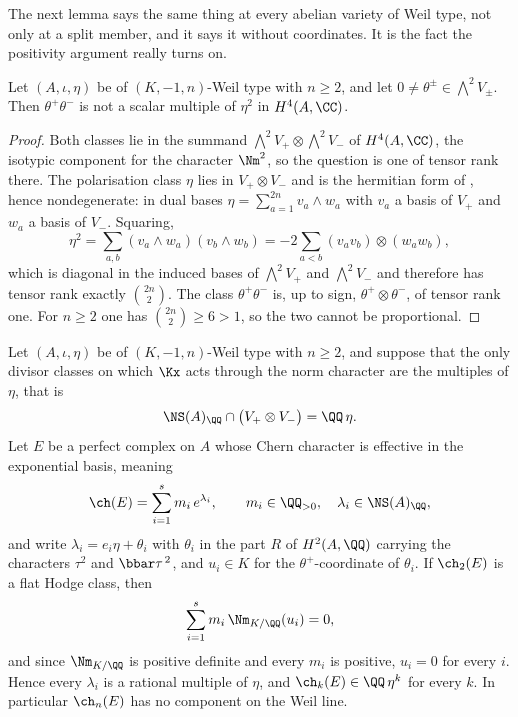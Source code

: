 The next lemma says the same thing at every abelian variety of Weil type, not
only at a split member, and it says it without coordinates. It is the fact the
positivity argument really turns on.

\begin{lemma}
\label{lem:tensorrank}
Let $(A,\iota,\eta)$ be of $(K,-1,n)$-Weil type with $n\ge2$, and let
$0\ne\theta^{\pm}\in\bigwedge^{2}V_{\pm}$. Then $\theta^{+}\theta^{-}$ is not a
scalar multiple of $\eta^{2}$ in $H^{4}(A,\CC)$.
\end{lemma}

\begin{proof}
Both classes lie in the summand
$\bigwedge^{2}V_{+}\otimes\bigwedge^{2}V_{-}$ of $H^{4}(A,\CC)$, the isotypic
component for the character $\Nm^{2}$, so the question is one of tensor rank
there. The polarisation class $\eta$ lies in $V_{+}\otimes V_{-}$ and is the
hermitian form of , hence nondegenerate: in dual bases
$\eta=\sum_{a=1}^{2n}v_{a}\wedge w_{a}$ with $v_{a}$ a basis of $V_{+}$ and
$w_{a}$ a basis of $V_{-}$. Squaring,
\[
  \eta^{2}
  =\sum_{a,b}(v_{a}\wedge w_{a})(v_{b}\wedge w_{b})
  =-2\sum_{a<b}(v_{a}v_{b})\otimes(w_{a}w_{b}),
\]
which is diagonal in the induced bases of $\bigwedge^{2}V_{+}$ and
$\bigwedge^{2}V_{-}$ and therefore has tensor rank exactly $\binom{2n}{2}$.
The class $\theta^{+}\theta^{-}$ is, up to sign,
$\theta^{+}\otimes\theta^{-}$, of tensor rank one. For $n\ge2$ one has
$\binom{2n}{2}\ge6>1$, so the two cannot be proportional.
\end{proof}

\begin{theorem}\label{thm:positivity}
Let $(A,\iota,\eta)$ be of $(K,-1,n)$-Weil type with $n\ge2$, and suppose that
the only divisor classes on which $\Kx$ acts through the norm character are
the multiples of $\eta$, that is
\begin{equation}\label{eq:noextranorm}
  \NS(A)_{\QQ}\cap\bigl(V_{+}\otimes V_{-}\bigr)=\QQ\,\eta .
\end{equation}
Let $E$ be a perfect complex on $A$ whose Chern character is effective in the
exponential basis, meaning
\begin{equation}\label{eq:effectivech}
  \ch(E)=\sum_{i=1}^{s}m_{i}\,e^{\lambda_{i}},
  \qquad m_{i}\in\QQ_{>0},\quad\lambda_{i}\in\NS(A)_{\QQ},
\end{equation}
and write $\lambda_{i}=e_{i}\eta+\theta_{i}$ with $\theta_{i}$ in the part $R$
of $H^{2}(A,\QQ)$ carrying the characters $\tau^{2}$ and $\bbar\tau^{\,2}$, and
$u_{i}\in K$ for the $\theta^{+}$-coordinate of $\theta_{i}$. If $\ch_{2}(E)$
is a flat Hodge class, then
\begin{equation}\label{eq:normsum}
  \sum_{i=1}^{s}m_{i}\,\Nm_{K/\QQ}(u_{i})=0 ,
\end{equation}
and since $\Nm_{K/\QQ}$ is positive definite and every $m_{i}$ is positive,
$u_{i}=0$ for every $i$. Hence every $\lambda_{i}$ is a rational multiple of
$\eta$, and $\ch_{k}(E)\in\QQ\,\eta^{k}$ for every $k$. In particular
$\ch_{n}(E)$ has no component on the Weil line.
\end{theorem}

